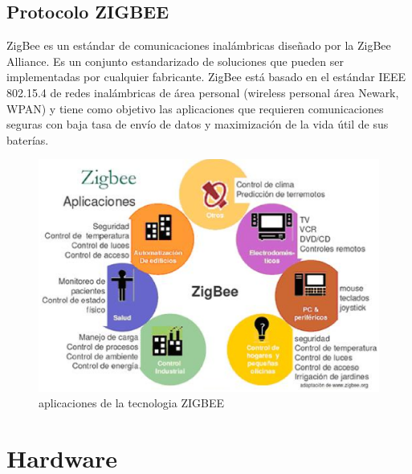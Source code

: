 \subsection{Protocolo ZIGBEE}
ZigBee es un estándar de comunicaciones inalámbricas diseñado por la ZigBee Alliance. Es un conjunto estandarizado de 
soluciones que pueden ser implementadas por cualquier fabricante. ZigBee está basado en el estándar IEEE 802.15.4 de redes 
inalámbricas de área personal (wireless  personal área Newark, WPAN) y tiene como objetivo las aplicaciones que requieren 
comunicaciones seguras con baja tasa de envío de datos y maximización de la vida útil de sus baterías\cite{12}.
\begin{figure}[h]
    \centering
    \includegraphics[width=1\textwidth]{ima/zb_phpI1D8AH}
    \caption{aplicaciones de la tecnologia ZIGBEE \cite{12}}
    \label{fig:mesh4}
\end{figure}
\section{Hardware}
